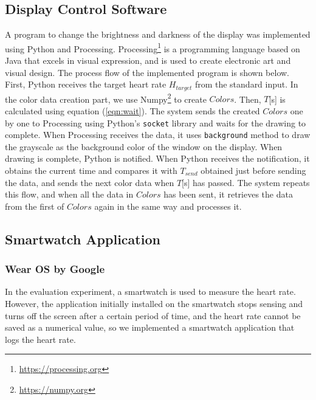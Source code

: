 \documentclass[sigchi,authordraft]{acmart}
\begin{document}
\subsection{Display Control Software}
\label{subsec:software}
A program to change the brightness and darkness of the display was implemented using Python and Processing. Processing\footnote{\url{https://processing.org}} is a programming language based on Java that excels in visual expression, and is used to create electronic art and visual design. The process flow of the implemented program is shown below. First, Python receives the target heart rate $H_{target}$ from the standard input. In the color data creation part, we use Numpy\footnote{\url{https://numpy.org}} to create $Colors$. Then, $T$[s] is calculated using equation (\ref{eqn:wait}). The system sends the created $Colors$ one by one to Processing using Python's \texttt{socket} library and waits for the drawing to complete. When Processing receives the data, it uses \texttt{background} method to draw the grayscale as the background color of the window on the display. When drawing is complete, Python is notified. When Python receives the notification, it obtains the current time and compares it with $T_{send}$ obtained just before sending the data, and sends the next color data when $T$[s] has passed. The system repeats this flow, and when all the data in $Colors$ has been sent, it retrieves the data from the first of $Colors$ again in the same way and processes it.


\subsection{Smartwatch Application}
\label{subsec:wearos}

\subsubsection{Wear OS by Google}
In the evaluation experiment, a smartwatch is used to measure the heart rate. However, the application initially installed on the smartwatch stops sensing and turns off the screen after a certain period of time, and the heart rate cannot be saved as a numerical value, so we implemented a smartwatch application that logs the heart rate.\par
\end{document}

